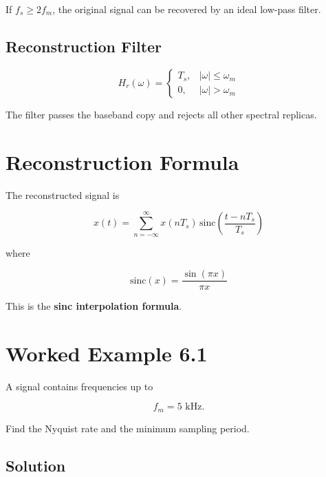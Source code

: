 If \(f_s\ge2f_m\), the original signal can be recovered by an ideal low-pass filter.


\subsection{Reconstruction Filter}

\[
\boxed{
H_r(\omega)=
\begin{cases}
T_s, & |\omega|\le\omega_m\\
0, & |\omega|>\omega_m
\end{cases}
}
\]

The filter passes the baseband copy and rejects all other spectral replicas.


\section{Reconstruction Formula}

The reconstructed signal is

\[
x(t)=
\sum_{n=-\infty}^{\infty}
x(nT_s)\,
\mathrm{sinc}\left(\frac{t-nT_s}{T_s}\right)
\]

where

\[
\boxed{
\mathrm{sinc}(x)=\frac{\sin(\pi x)}{\pi x}
}
\]

This is the \textbf{sinc interpolation formula}.


\section{Worked Example 6.1}

A signal contains frequencies up to

\[
f_m=5\text{ kHz}.
\]

Find the Nyquist rate and the minimum sampling period.


\subsection{Solution}

